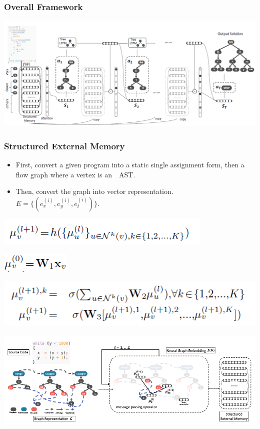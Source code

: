 \documentclass[11pt]{beamer}
\begin{document}
\begin{frame}\frametitle{Overall Framework}
\begin{center}
\includegraphics[scale = 0.39]{2.png}

\end{center}

\end{frame}

\begin{frame}\frametitle{Structured External Memory}
\begin{itemize}
\item First, convert a given program into a static single assignment form, then a flow graph where a vertex is an　AST.

\item Then, convert the graph into vector representation. $E = \{(e_x^{(i)}, e_y^{(i)},e_t^{(i)})\}$.

\end{itemize}
\begin{center}

\includegraphics[scale = 0.4]{6.png}

\includegraphics[scale = 0.4]{5.png}

\includegraphics[scale = 0.4]{4.png}

\includegraphics[scale = 0.4]{3.png}
\end{center}

\end{frame}
\end{document}
